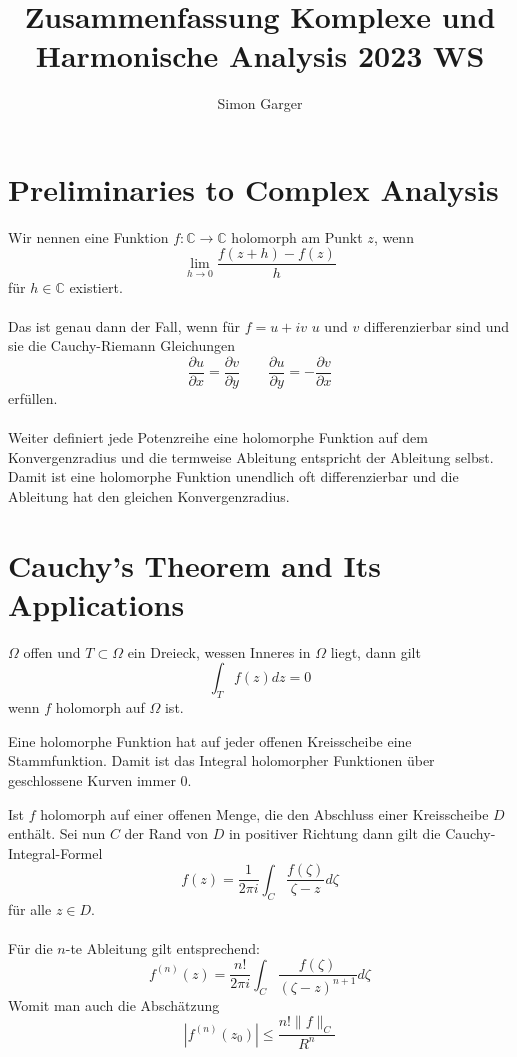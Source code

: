 \documentclass[11pt]{article}
\title{Zusammenfassung Komplexe und Harmonische Analysis 2023 WS}
\author{Simon Garger}
\newenvironment{problem}[1]{
    \begin{trivlist}
        \item[\hskip \labelsep {\bfseries #1}] }{
    \end{trivlist}\normalshape
}
\newcommand{\C}{\mathbb{C}}
\begin{document}
    \maketitle
    \section{Preliminaries to Complex Analysis}
    \begin{problem}{Holomorphie}
        Wir nennen eine Funktion $f:\C\to \C$ holomorph am Punkt $z$, wenn
        $$\lim_{h\to 0}\frac{f(z+h)-f(z)}{h}$$
        für $h\in \C$ existiert. \\\\
        Das ist genau dann der Fall, wenn für $f=u+iv$ $u$ und $v$ differenzierbar sind und sie
        die Cauchy-Riemann Gleichungen
        $$\frac{\partial u}{\partial x}=\frac{\partial v}{\partial y}\qquad
        \frac{\partial u}{\partial y}=-\frac{\partial v}{\partial x}$$
        erfüllen. \\\\
        Weiter definiert jede Potenzreihe eine holomorphe Funktion auf dem Konvergenzradius und
        die termweise Ableitung entspricht der Ableitung selbst. Damit ist eine holomorphe Funktion
        unendlich oft differenzierbar und die Ableitung hat den gleichen Konvergenzradius.
    \end{problem}

    \section{Cauchy’s Theorem and Its Applications}
    \begin{problem}{Goursat}
        $\Omega$ offen und $T\subset\Omega$ ein Dreieck, wessen Inneres in $\Omega$ liegt, dann
        gilt
        $$\int_T f(z)dz=0$$
        wenn $f$ holomorph auf $\Omega$ ist.
    \end{problem}

    \begin{problem}{Stammfunktionen}
        Eine holomorphe Funktion hat auf jeder offenen Kreisscheibe eine Stammfunktion. Damit ist
        das Integral holomorpher Funktionen über geschlossene Kurven immer $0$.
    \end{problem}

    \begin{problem}{Cauchy-Integral-Formel}
        Ist $f$ holomorph auf einer offenen Menge, die den Abschluss einer Kreisscheibe $D$ enthält.
        Sei nun $C$ der Rand von $D$ in positiver Richtung dann gilt die Cauchy-Integral-Formel
        $$f(z)=\frac{1}{2\pi i}\int_C\frac{f(\zeta)}{\zeta -z}d\zeta$$
        für alle $z\in D$. \\\\
        Für die $n$-te Ableitung gilt entsprechend:
        $$f^{(n)}(z)=\frac{n!}{2\pi i}\int_C\frac{f(\zeta)}{(\zeta-z)^{n+1}}d\zeta$$
        Womit man auch die Abschätzung
        $$|f^{(n)}(z_0)|\leq \frac{n!\|f\|_C}{R^n}$$
    \end{problem}
\end{document}
